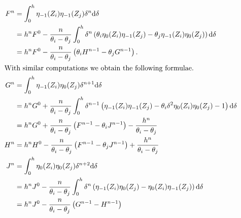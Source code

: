 \begin{align*}
  F^{n} & = \int_{0}^{h}\eta_{-1}(Z_i)\eta_{-1}(Z_j) \delta^{n} \dd \delta                                                                                    \\
        & =h^{n} F^0 - \frac{n}{\theta_i - \theta_j}\int_{0}^{h} \delta^{n} \left( \theta_i \eta_{0}(Z_i)\eta_{-1}(Z_j)
  - \theta_j \eta_{-1}(Z_i)\eta_{0}(Z_j) \right) \dd \delta                                                                                                   \\
        & =h^{n} F^0 - \frac{n}{\theta_i-\theta_j}\left(\theta_i H^{n-1} - \theta_j G^{n-1}\right) \text{.}                                                   \\
  \intertext{With similar computations we obtain the following formulae.}
  G^{n} & = \int_{0}^{h}\eta_{-1}(Z_i)\eta_{0}(Z_j) \delta^{n+1} \dd \delta                                                                                   \\
        & = h^{n} G^0 + \frac{n}{\theta_i - \theta_j}\int_0^h \delta^{n-1} \left( \eta_{-1}(Z_i)\eta_{-1}(Z_j)
  - \theta_i\delta^2 \eta_{0}(Z_i)\eta_{0}(Z_j)  - 1 \right) \dd \delta                                                                                       \\
        & = h^{n} G^0 + \frac{n}{\theta_i - \theta_j}\left( F^{n-1} - \theta_i J^{n-1}\right) - \frac{h^{n}}{\theta_i - \theta_j}                             \\
  H^{n} & = h^{n} H^0 - \frac{n }{\theta_i - \theta_j}\left( F^{n-1} - \theta_j J^{n-1}\right) + \frac{h^{n}}{\theta_i - \theta_j}                            \\
  J^{n} & = \int_{0}^{h}\eta_{0}(Z_i)\eta_{0}(Z_j) \delta^{n+2} \dd \delta                                                                                    \\
        & = h^{n} J^0 - \frac{n }{\theta_i - \theta_j}\int_0^h \delta^{n} \left( \eta_{-1}(Z_i)\eta_{0}(Z_j) - \eta_{0}(Z_i)\eta_{-1}(Z_j) \right) \dd \delta \\
        & = h^{n} J^0 - \frac{n }{\theta_i - \theta_j}\left( G^{n-1} - H^{n-1} \right)
\end{align*}

